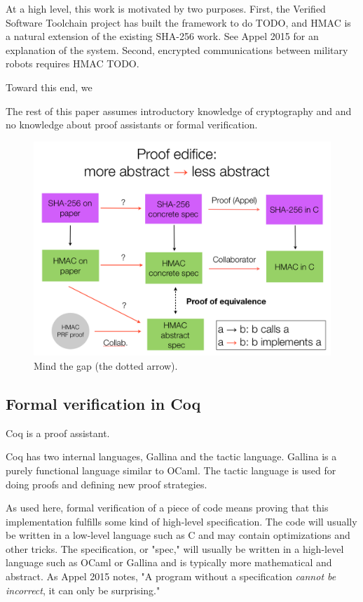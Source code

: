 \documentclass[twocolumn,showpacs,%
  nofootinbib,aps,superscriptaddress,%
  eqsecnum,prd,notitlepage,showkeys,10pt]{revtex4-1}
\begin{document}
At a high level, this work is motivated by two purposes. First, the Verified Software Toolchain project has built the framework to do TODO, and HMAC is a natural extension of the existing SHA-256 work. See Appel 2015 for an explanation of the system. Second, encrypted communications between military robots requires HMAC TODO. 

Toward this end, we

The rest of this paper assumes introductory knowledge of cryptography and and no knowledge about proof assistants or formal verification.

\begin{figure}[h!]
	\centering
	\includegraphics[scale=0.35]{Proof_edifice}
	\caption{Mind the gap (the dotted arrow).}
\end{figure}	

\subsection{Formal verification in Coq}

Coq is a proof assistant.

Coq has two internal languages, Gallina and the tactic language. Gallina is a purely functional language similar to OCaml. The tactic language is used for doing proofs and defining new proof strategies.

As used here, formal verification of a piece of code means proving that this implementation fulfills some kind of high-level specification. The code will usually be written in a low-level language such as C and may contain optimizations and other tricks. The specification, or "spec," will usually be written in a high-level language such as OCaml or Gallina and is typically more mathematical and abstract. As Appel 2015 notes, "A program without a specification {\it cannot be incorrect}, it can only
be surprising."
\end{document}
